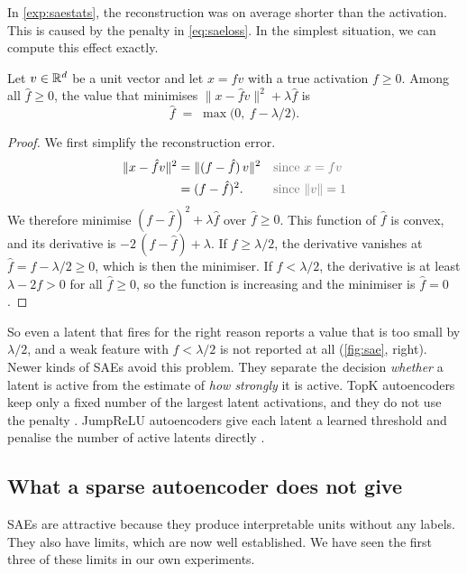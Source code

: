 In \cref{exp:saestats}, the reconstruction was on average shorter than the activation. This is caused by the
penalty in \eqref{eq:saeloss}. In the simplest situation, we can compute this effect exactly.

\begin{proposition}[Shrinkage]\label{prop:shrink}
Let $v\in\mathbb{R}^d$ be a unit vector and let $x=fv$ with a true activation $f\ge0$. Among all $\hat f\ge0$, the value
that minimises $\|x-\hat fv\|^2+\lambda\hat f$ is
\[
\hat f \;=\; \max\big(0,\ f-\lambda/2\big).
\]
\end{proposition}
\begin{proof}
We first simplify the reconstruction error.
\begin{align*}
\|x-\hat fv\|^2 &= \|(f-\hat f)\,v\|^2 && \by{since $x=fv$}\\
&= (f-\hat f)^2. && \by{since $\|v\|=1$}
\end{align*}
We therefore minimise $(f-\hat f)^2+\lambda\hat f$ over $\hat f\ge0$. This function of $\hat f$ is convex, and its
derivative is $-2\,(f-\hat f)+\lambda$. If $f\ge\lambda/2$, the derivative vanishes at $\hat f=f-\lambda/2\ge0$,
which is then the minimiser. If $f<\lambda/2$, the derivative is at least $\lambda-2f>0$ for all $\hat f\ge0$, so
the function is increasing and the minimiser is $\hat f=0$.
\end{proof}

So even a latent that fires for the right reason reports a value that is too small by $\lambda/2$, and a weak
feature with $f<\lambda/2$ is not reported at all (\cref{fig:sae}, right). Newer kinds of SAEs avoid this problem.
They separate the decision \emph{whether} a latent is active from the estimate of \emph{how strongly} it is active.
TopK autoencoders keep only a fixed number of the largest latent activations, and they do not use the penalty
\citep{gao2025scaling}. JumpReLU autoencoders give each latent a learned threshold and penalise the number of
active latents directly \citep{rajamanoharan2024jumping}.

\subsection{What a sparse autoencoder does not give}

SAEs are attractive because they produce interpretable units without any labels. They also have limits, which
are now well established. We have seen the first three of these limits in our own experiments.

